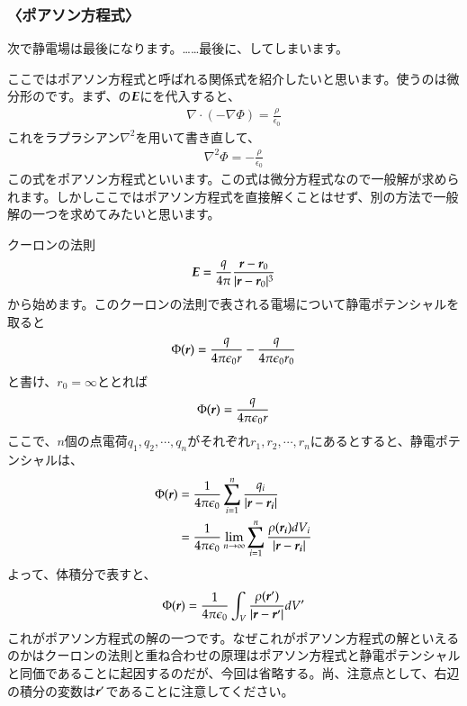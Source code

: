 \documentclass[10pt,b5paper,papersize,dvipdfmx]{jsbook}
\begin{document}
\subsubsection{〈ポアソン方程式〉}
次で静電場は最後になります。……最後に、してしまいます。\par
ここではポアソン方程式と呼ばれる関係式を紹介したいと思います。使うのは微分形のです。まず、の$\vb*{E}$にを代入すると、
\begin{align}
  \nabla\cdot(-\nabla\Phi ) =  \frac{\rho}{\epsilon_0}
\end{align}
これをラプラシアン$\nabla^2$を用いて書き直して、
\begin{align}
  \nabla^2 \Phi = - \frac{\rho}{\epsilon_0}
\end{align}
この式をポアソン方程式といいます。この式は微分方程式なので一般解が求められます。しかしここではポアソン方程式を直接解くことはせず、別の方法で一般解の一つを求めてみたいと思います。\par
クーロンの法則
\begin{align}
  \vb*{E} = \frac{q}{4\pi}\frac{\vb*{r}-\vb*{r}_0}{|\vb*{r}-\vb*{r}_0|^3}
\end{align}
から始めます。このクーロンの法則で表される電場について静電ポテンシャルを取ると
\begin{align}
  \Phi(\vb*{r}) = \frac{q}{4\pi\epsilon_0 r}-\frac{q}{4\pi\epsilon_0 r_0}
\end{align}
と書け、$r_0 = \infty$ととれば
\begin{align}
  \Phi(\vb*{r}) = \frac{q}{4\pi\epsilon_0 r}
\end{align}
ここで、$n$個の点電荷$q_1,q_2,\cdots,q_n$がそれぞれ$r_1,r_2,\cdots,r_n$にあるとすると、静電ポテンシャルは、
\begin{align}
  \Phi(\vb*{r}) 
  &= \frac{1}{4\pi\epsilon_0} \sum_{i=1}^n \frac{q_i}{|\vb*{r}-\vb*{r_i}|} \\
  &= \frac{1}{4\pi\epsilon_0}\lim_{n \to \infty} \sum_{i=1}^n \frac{\rho(\vb*{r_i}) dV_i}{|\vb*{r}-\vb*{r_i}|}
\end{align}
よって、体積分で表すと、
\begin{align}
  \Phi(\vb*{r}) = \frac{1}{4\pi\epsilon_0}\int_V \frac{\rho(\vb*{r}')}{|\vb*{r}-\vb*{r}'|}dV'
\end{align}
これがポアソン方程式の解の一つです。なぜこれがポアソン方程式の解といえるのかはクーロンの法則と重ね合わせの原理はポアソン方程式と静電ポテンシャルと同価であることに起因するのだが、今回は省略する。尚、注意点として、右辺の積分の変数は$\vb*{r}'$であることに注意してください。
\end{document}
